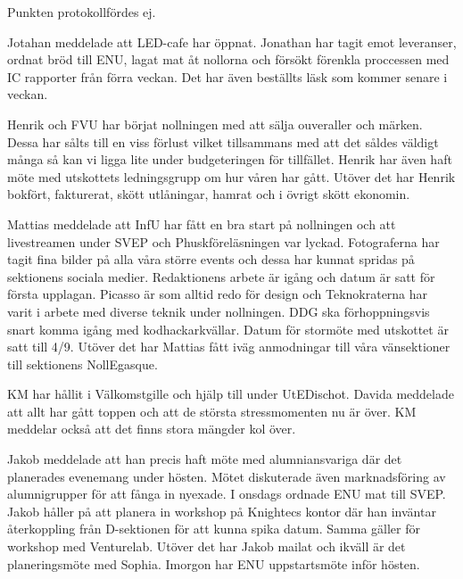 \documentclass[10pt]{article}
\begin{document}
\begin{paragrafer}
\begin{fyllnadsval}
\end{fyllnadsval}

\begin{paragrafer}
Punkten protokollfördes ej.


Jotahan meddelade att LED-cafe har öppnat. Jonathan har tagit emot leveranser, ordnat bröd till ENU, lagat mat åt nollorna och försökt förenkla proccessen med IC rapporter från förra veckan. 
Det har även beställts läsk som kommer senare i veckan. 

Henrik och FVU har börjat nollningen med att sälja ouveraller och märken. Dessa har sålts till en viss förlust vilket tillsammans med att det såldes väldigt många så kan vi ligga lite under budgeteringen för tillfället. 
Henrik har även haft möte med utskottets ledningsgrupp om hur våren har gått. 
Utöver det har Henrik bokfört, fakturerat, skött utlåningar, hamrat och i övrigt skött ekonomin.

Mattias meddelade att InfU har fått en bra start på nollningen och att livestreamen under SVEP och Phuskföreläsningen var lyckad. Fotograferna har tagit fina bilder på alla våra större events och dessa har kunnat spridas på sektionens sociala medier. Redaktionens arbete är igång och datum är satt för första upplagan. 
Picasso är som alltid redo för design och Teknokraterna har varit i arbete med diverse teknik under nollningen. DDG ska förhoppningsvis snart komma igång med kodhackarkvällar. Datum för stormöte med utskottet är satt till 4/9. 
Utöver det har Mattias fått iväg anmodningar till våra vänsektioner till sektionens NollEgasque.

KM har hållit i Välkomstgille och hjälp till under UtEDischot. Davida meddelade att allt har gått toppen och att de största stressmomenten nu är över. KM meddelar också att det finns stora mängder kol över.

Jakob meddelade att han precis haft möte med alumniansvariga där det planerades evenemang under hösten. Mötet diskuterade även marknadsföring av alumnigrupper för att fånga in nyexade.
I onsdags ordnade ENU mat till SVEP. Jakob håller på att planera in workshop på Knightecs kontor där han inväntar återkoppling från D-sektionen för att kunna spika datum. Samma gäller för workshop med Venturelab. Utöver det har Jakob mailat och ikväll är det planeringsmöte med Sophia. Imorgon har ENU uppstartsmöte inför hösten.


\end{paragrafer}
\end{paragrafer}
\end{document}
